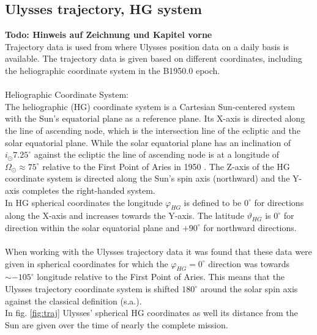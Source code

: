 \subsection{Ulysses trajectory, HG system}
\textbf{Todo: Hinweis auf Zeichnung und Kapitel vorne}\\
Trajectory data is used from \citet{ulysses-data-archive} where Ulysses position data on a daily basis is available. The trajectory data is given based on different coordinates, including the heliographic coordinate system in the B1950.0 epoch.
\\ \\
Heliographic Coordinate System:\\
The heliographic (HG) coordinate system is a Cartesian Sun-centered system with the Sun's equatorial plane as a reference plane. Its X-axis is directed along the line of ascending node, which is the intersection line of the ecliptic and the solar equatorial plane. While the solar equatorial plane has an inclination of $i_\odot 7.25 ^\circ$ against the ecliptic \citep{fraenz_harper} the line of ascending node is at a longitude of $\Omega_\odot \approx 75^\circ$ relative to the First Point of Aries in 1950 \citep{nasa-earth-coord}. The Z-axis of the HG coordinate system is directed along the Sun's spin axis (northward) and the Y-axis completes the right-handed system. \\
In HG spherical coordinates the longitude $\varphi_{HG}$ is defined to be $0^\circ$ for directions along the X-axis and increases towards the Y-axis. The latitude $\vartheta_{HG}$ is $0^\circ$ for direction within the solar equatorial plane and $+90^\circ$ for northward directions.\\ \\
%
%
When working with the Ulysses trajectory data it was found that these data were given in spherical coordinates for which the $\varphi_{HG} = 0^\circ$ direction was towards $\sim -105 ^\circ$ longitude relative to the First Point of Aries. This means that the Ulysses trajectory coordinate system is shifted $180^\circ$ around the solar spin axis against the classical definition (s.a.).\\
In fig. \ref{fig:traj} Ulysses' spherical HG coordinates as well its distance from the Sun are given over the time of nearly the complete mission.


